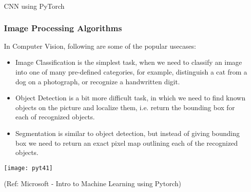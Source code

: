 \begin{frame}
  \begin{center}
    {\Large CNN using PyTorch}
    
  \end{center}
  
\end{frame}

\begin{frame}[fragile] \frametitle{Image Processing Algorithms}

In Computer Vision, following are some of the popular usecases:

\begin{itemize}
\item Image Classification is the simplest task, when we need to classify an image into one of many pre-defined categories, for example, distinguish a cat from a dog on a photograph, or recognize a handwritten digit.

\item Object Detection is a bit more difficult task, in which we need to find known objects on the picture and localize them, i.e. return the bounding box for each of recognized objects.

\item Segmentation is similar to object detection, but instead of giving bounding box we need to return an exact pixel map outlining each of the recognized objects.
\end{itemize}

\begin{center}
\texttt{[image: pyt41]}
\end{center}

\tiny{(Ref: Microsoft - Intro to Machine Learning using Pytorch)}
\end{frame}

